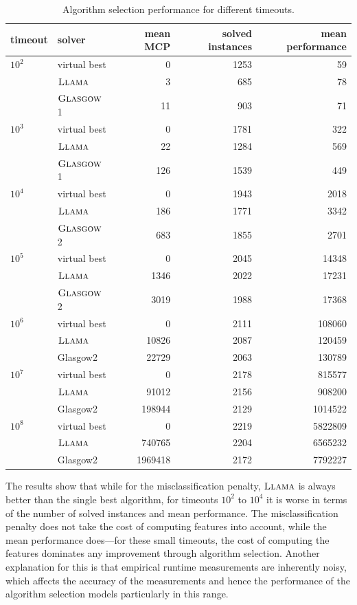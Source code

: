 \documentclass{llncs}
\newcommand{\Glasgow}{$\textsc{Glasgow}$\xspace}
\newcommand{\LLAMA}{$\textsc{Llama}$\xspace}
\begin{document}
\begin{table}[ht]
\centering
\begin{tabular}{llrrr}
  \toprule
timeout & solver & mean MCP & solved instances & mean performance\\
  \midrule
$10^2$ & virtual best & 0 & 1253 & 59\\
 & \LLAMA & 3 & 685 & 78\\
 & \Glasgow1 & 11 & 903 & 71\\
  \midrule
$10^3$ & virtual best & 0 & 1781 & 322\\
 & \LLAMA & 22 & 1284 & 569\\
 & \Glasgow1 & 126 & 1539 & 449\\
  \midrule
$10^4$ & virtual best & 0 & 1943 & 2018\\
 & \LLAMA & 186 & 1771 & 3342\\
 & \Glasgow2 & 683 & 1855 & 2701\\
  \midrule
$10^5$ & virtual best & 0 & 2045 & 14348\\
 & \LLAMA & 1346 & 2022 & 17231\\
 & \Glasgow2 & 3019 & 1988 & 17368\\
  \midrule
$10^6$ & virtual best & 0 & 2111 & 108060\\
 & \LLAMA & 10826 & 2087 & 120459\\
 & Glasgow2 & 22729 & 2063 & 130789\\
  \midrule
$10^7$ & virtual best & 0 & 2178 & 815577\\
 & \LLAMA & 91012 & 2156 & 908200\\
 & Glasgow2 & 198944 & 2129 & 1014522\\
  \midrule
$10^8$ & virtual best & 0 & 2219 & 5822809\\
 & \LLAMA & 740765 & 2204 & 6565232\\
 & Glasgow2 & 1969418 & 2172 & 7792227\\
\bottomrule
\end{tabular}
\vspace{1ex}
\caption{Algorithm selection performance for different timeouts.}\label{tab:resTimeouts}
\end{table}

The results show that while for the misclassification penalty, \LLAMA is always
better than the single best algorithm, for timeouts $10^2$ to $10^4$ it is worse
in terms of the number of solved instances and mean performance. The
misclassification penalty does not take the cost of computing features into
account, while the mean performance does---for these small timeouts, the cost
of computing the features dominates any improvement through algorithm selection.
Another explanation for this is that empirical runtime measurements are
inherently noisy, which affects the accuracy of the measurements and hence the
performance of the algorithm selection models particularly in this range.
\end{document}
